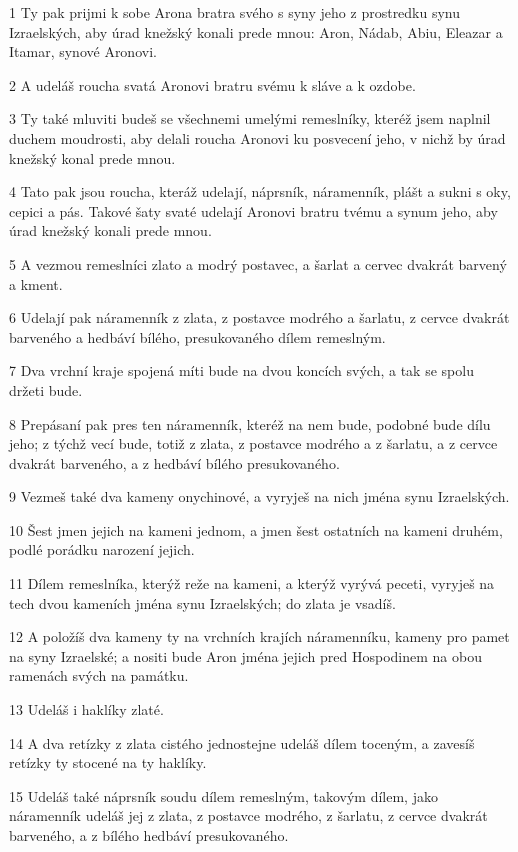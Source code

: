 \par 1 Ty pak prijmi k sobe Arona bratra svého s syny jeho z prostredku synu Izraelských, aby úrad knežský konali prede mnou: Aron, Nádab, Abiu, Eleazar a Itamar, synové Aronovi.
\par 2 A udeláš roucha svatá Aronovi bratru svému k sláve a k ozdobe.
\par 3 Ty také mluviti budeš se všechnemi umelými remeslníky, kteréž jsem naplnil duchem moudrosti, aby delali roucha Aronovi ku posvecení jeho, v nichž by úrad knežský konal prede mnou.
\par 4 Tato pak jsou roucha, kteráž udelají, náprsník, náramenník, plášt a sukni s oky, cepici a pás. Takové šaty svaté udelají Aronovi bratru tvému a synum jeho, aby úrad knežský konali prede mnou.
\par 5 A vezmou remeslníci zlato a modrý postavec, a šarlat a cervec dvakrát barvený a kment.
\par 6 Udelají pak náramenník z zlata, z postavce modrého a šarlatu, z cervce dvakrát barveného a hedbáví bílého, presukovaného dílem remeslným.
\par 7 Dva vrchní kraje spojená míti bude na dvou koncích svých, a tak se spolu držeti bude.
\par 8 Prepásaní pak pres ten náramenník, kteréž na nem bude, podobné bude dílu jeho; z týchž vecí bude, totiž z zlata, z postavce modrého a z šarlatu, a z cervce dvakrát barveného, a z hedbáví bílého presukovaného.
\par 9 Vezmeš také dva kameny onychinové, a vyryješ na nich jména synu Izraelských.
\par 10 Šest jmen jejich na kameni jednom, a jmen šest ostatních na kameni druhém, podlé porádku narození jejich.
\par 11 Dílem remeslníka, kterýž reže na kameni, a kterýž vyrývá peceti, vyryješ na tech dvou kameních jména synu Izraelských; do zlata je vsadíš.
\par 12 A položíš dva kameny ty na vrchních krajích náramenníku, kameny pro pamet na syny Izraelské; a nositi bude Aron jména jejich pred Hospodinem na obou ramenách svých na památku.
\par 13 Udeláš i haklíky zlaté.
\par 14 A dva retízky z zlata cistého jednostejne udeláš dílem toceným, a zavesíš retízky ty stocené na ty haklíky.
\par 15 Udeláš také náprsník soudu dílem remeslným, takovým dílem, jako náramenník udeláš jej z zlata, z postavce modrého, z šarlatu, z cervce dvakrát barveného, a z bílého hedbáví presukovaného.
